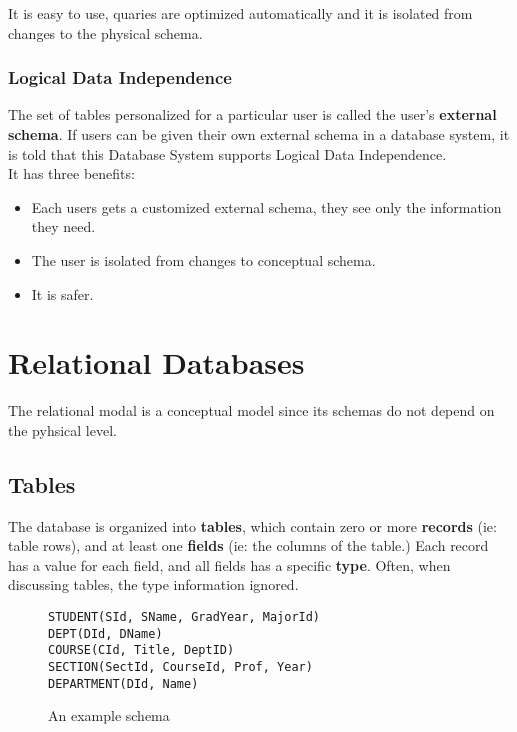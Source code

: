 \documentclass[11pt,a4paper,twocolumn]{book}
\begin{document}
It is easy to use, quaries are optimized automatically and it is isolated from changes to the physical schema.

\subsubsection{Logical Data Independence}

The set of tables personalized for a particular user is called the user's \textbf{external schema}. If users can be given their own external schema in a database system, it is told that this Database System supports Logical Data Independence.\\

It has three benefits:

\begin{itemize}
\item Each users gets a customized external schema, they see only the information they need.
\item The user is isolated from changes to conceptual schema.
\item It is safer.
\end{itemize}

\section{Relational Databases}

The relational modal is a conceptual model since its schemas do not depend on the pyhsical level.

\subsection{Tables}

The database is organized into \textbf{tables}, which contain zero or more \textbf{records} (ie: table rows), and at least one \textbf{fields} (ie: the columns of the table.) Each record has a value for each field, and all fields has a specific \textbf{type}. Often, when discussing tables, the type information ignored.

\begin{figure}
\begin{lstlisting}
STUDENT(SId, SName, GradYear, MajorId)
DEPT(DId, DName)
COURSE(CId, Title, DeptID)
SECTION(SectId, CourseId, Prof, Year)
DEPARTMENT(DId, Name)
\end{lstlisting}
\caption{An example schema}
\label{schema:univesity}
\end{figure}
\end{document}
